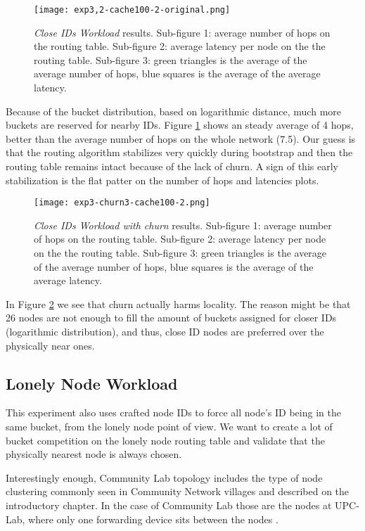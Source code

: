 \documentclass[conference]{IEEEtran}
\begin{document}
\begin{figure}
    \texttt{[image: exp3,2-cache100-2-original.png]}
    \caption{\textit{Close IDs Workload} results. Sub-figure 1: average number of hops on the routing table. Sub-figure 2: average latency per node on the the routing table. Sub-figure 3: green triangles is the average of the average number of hops, blue squares is the average of the average latency.}
    \label{fig:exp3,2-cache100-2-original}
\end{figure}

Because of the bucket distribution, based on logarithmic distance, much more buckets are reserved for nearby IDs. Figure \ref{fig:exp3,2-cache100-2-original} shows an steady average of 4 hops, better than the average number of hops on the whole network (7.5). Our guess is that the routing algorithm stabilizes very quickly during bootstrap and then the routing table remains intact because of the lack of churn. A sign of this early stabilization is the flat patter on the number of hops and latencies plots.

\begin{figure}
    \texttt{[image: exp3-churn3-cache100-2.png]}
    \caption{\textit{Close IDs Workload with churn} results. Sub-figure 1: average number of hops on the routing table. Sub-figure 2: average latency per node on the the routing table. Sub-figure 3: green triangles is the average of the average number of hops, blue squares is the average of the average latency.}
    \label{fig:exp3-churn3-cache100-2}
\end{figure}

In Figure \ref{fig:exp3-churn3-cache100-2} we see that churn actually harms locality. The reason might be that 26 nodes are not enough to fill the amount of buckets assigned for closer IDs (logarithmic distribution), and thus, close ID nodes are preferred over the physically near ones.


\subsection{Lonely Node Workload}

This experiment also uses crafted node IDs to force all node's ID being in the same bucket, from the lonely node point of view. We want to create a lot of bucket competition on the lonely node routing table and validate that the physically nearest node is always chosen.

Interestingly enough, Community Lab topology includes the type of node clustering commonly seen in Community Network villages and described on the introductory chapter. In the case of Community Lab those are the nodes at UPC-Lab, where only one forwarding device sits between the nodes \cite{b19}.
\end{document}
